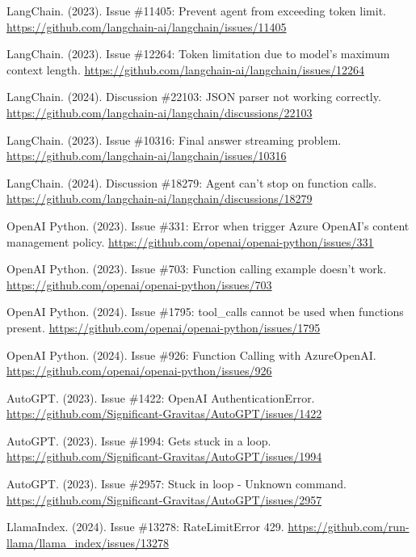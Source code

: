 \documentclass[11pt]{article}
\begin{document}
\begin{thebibliography}{99}
LangChain. (2023). Issue \#11405: Prevent agent from exceeding token limit. \url{https://github.com/langchain-ai/langchain/issues/11405}

LangChain. (2023). Issue \#12264: Token limitation due to model's maximum context length. \url{https://github.com/langchain-ai/langchain/issues/12264}

LangChain. (2024). Discussion \#22103: JSON parser not working correctly. \url{https://github.com/langchain-ai/langchain/discussions/22103}

LangChain. (2023). Issue \#10316: Final answer streaming problem. \url{https://github.com/langchain-ai/langchain/issues/10316}

LangChain. (2024). Discussion \#18279: Agent can't stop on function calls. \url{https://github.com/langchain-ai/langchain/discussions/18279}

OpenAI Python. (2023). Issue \#331: Error when trigger Azure OpenAI's content management policy. \url{https://github.com/openai/openai-python/issues/331}

OpenAI Python. (2023). Issue \#703: Function calling example doesn't work. \url{https://github.com/openai/openai-python/issues/703}

OpenAI Python. (2024). Issue \#1795: tool\_calls cannot be used when functions present. \url{https://github.com/openai/openai-python/issues/1795}

OpenAI Python. (2024). Issue \#926: Function Calling with AzureOpenAI. \url{https://github.com/openai/openai-python/issues/926}

AutoGPT. (2023). Issue \#1422: OpenAI AuthenticationError. \url{https://github.com/Significant-Gravitas/AutoGPT/issues/1422}

AutoGPT. (2023). Issue \#1994: Gets stuck in a loop. \url{https://github.com/Significant-Gravitas/AutoGPT/issues/1994}

AutoGPT. (2023). Issue \#2957: Stuck in loop - Unknown command. \url{https://github.com/Significant-Gravitas/AutoGPT/issues/2957}

LlamaIndex. (2024). Issue \#13278: RateLimitError 429. \url{https://github.com/run-llama/llama_index/issues/13278}


\end{thebibliography}
\end{document}

